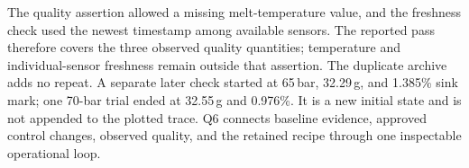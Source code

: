 The quality assertion allowed a missing melt-temperature value, and the
freshness check used the newest timestamp among available sensors. The
reported pass therefore covers the three observed quality quantities;
temperature and individual-sensor freshness remain outside that assertion.
The duplicate archive adds no repeat.
A separate later check started at 65\,bar,
32.29\,g, and 1.385\% sink mark; one 70-bar trial ended at 32.55\,g and
0.976\%. It is a new initial state and is not appended to the plotted trace.
Q6 connects baseline evidence, approved control changes, observed quality,
and the retained recipe through one inspectable operational loop.
